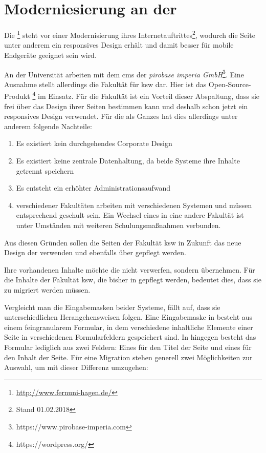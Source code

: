     \section{Moderniesierung an der \fernUni}
        Die \fernUni\footnote{\url{http://www.fernuni-hagen.de/}}
        steht vor einer Modernisierung ihres Internetauftrittes\footnote{Stand 01.02.2018},
        wodurch die Seite unter anderem ein responsives Design erhält und damit besser für
        mobile Endgeräte geeignet sein wird.

        An der Universität arbeiten \editors mit dem \gls{cms} \textit{\imperia}
        der \textit{pirobase imperia GmbH}\footnote{https://www.pirobase-imperia.com}.
        Eine Ausnahme stellt allerdings die Fakultät für \gls{ksw} dar.
        Hier ist das Open-Source-Produkt \textit{\wordpress}\footnote{https://wordpress.org/} im Einsatz.
        Für die Fakultät ist ein Vorteil dieser Abspaltung,
        dass sie frei über das Design ihrer Seiten bestimmen kann
        und deshalb schon jetzt ein responsives Design verwendet.
        Für die \fernUni als Ganzes hat dies allerdings unter anderem folgende Nachteile:

        \begin{enumerate}
            \item   Es existiert kein durchgehendes Corporate Design
            \item   Es existiert keine zentrale Datenhaltung, da beide Systeme ihre Inhalte getrennt speichern
            \item   Es entsteht ein erhöhter Administrationsaufwand
            \item   \editors verschiedener Fakultäten arbeiten mit verschiedenen Systemen und müssen entsprechend geschult sein.
                    Ein Wechsel eines \editors in eine andere Fakultät ist unter Umständen mit weiteren Schulungsmaßnahmen verbunden.
        \end{enumerate}

        Aus diesen Gründen sollen die Seiten der Fakultät \gls{ksw}
        in Zukunft das neue Design der \fernUni verwenden und ebenfalls
        über \imperia gepflegt werden.

        Ihre vorhandenen Inhalte möchte die \fernUni nicht verwerfen, sondern übernehmen.
        Für die Inhalte der Fakultät \gls{ksw}, die bisher in \wordpress gepflegt werden,
        bedeutet dies, dass sie zu \imperia migriert werden müssen.

        Vergleicht man die Eingabemasken beider Systeme, fällt auf,
        dass sie unterschiedlichen Herangehensweisen folgen.
        Eine Eingabemaske in \imperia besteht aus einem feingranularem Formular,
        in dem verschiedene inhaltliche Elemente einer Seite in verschiedenen Formularfeldern
        gespeichert sind.
        In \wordpress hingegen besteht das Formular lediglich aus zwei Feldern:
        Eines für den Titel der Seite und eines für den Inhalt der Seite.
        Für eine Migration stehen generell zwei Möglichkeiten zur Auswahl,
        um mit dieser Differenz umzugehen:


